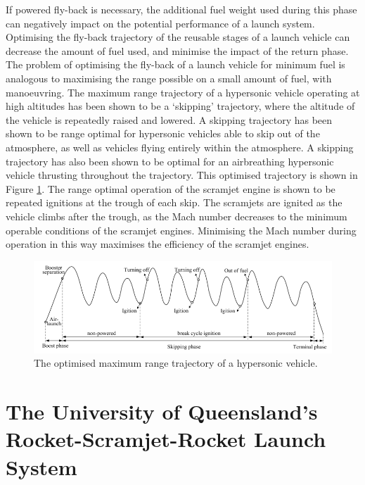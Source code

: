 If powered fly-back is necessary, the additional fuel weight used during this phase can negatively impact on the potential performance of a launch system. 
Optimising the fly-back trajectory of the reusable stages of a launch vehicle can decrease the amount of fuel used, and minimise the impact of the return phase. 
 The problem of optimising the fly-back of a launch vehicle for minimum fuel is analogous to maximising the range possible on a small amount of fuel, with manoeuvring. The maximum range trajectory of a hypersonic vehicle operating at high altitudes has been shown to be a `skipping' trajectory, where the altitude of the vehicle is repeatedly raised and lowered\cite{Moshman2014,Darby2011,Toso2015,Chai2015}. A skipping trajectory has been shown to be range optimal for hypersonic vehicles able to skip out of the atmosphere\cite{Moshman2014}, as well as vehicles flying entirely within the atmosphere\cite{Moshman2014,Darby2011,Toso2015,Tetlow1992}. A skipping trajectory has also been shown to be optimal for an airbreathing hypersonic vehicle thrusting throughout the trajectory\cite{Chai2015}. This optimised trajectory is shown in Figure \ref{fig:chai-boostskip}. The range optimal operation of the scramjet engine is shown to be repeated ignitions at the trough of each skip\cite{Chai2015}. The scramjets are ignited as the vehicle climbs after the trough, as the Mach number decreases to the minimum operable conditions of the scramjet engines\cite{Chai2015}. Minimising the Mach number during operation in this way maximises the efficiency of the scramjet engines\cite{Chai2015}.
 
 \begin{figure}[ht]
 	\centering
 	\includegraphics[width=0.9\linewidth]{"figures/2_literature-review/chai-boost skip"}
 	\caption{The optimised maximum range trajectory of a hypersonic vehicle\cite{Chai2015}.}
 	\label{fig:chai-boostskip}
 \end{figure}



\section{The University of Queensland's Rocket-Scramjet-Rocket Launch System}


